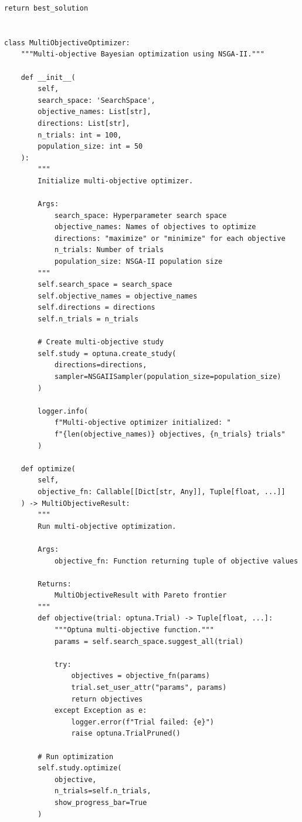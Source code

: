 \begin{lstlisting}[style=python, caption={Multi-objective optimization with Pareto frontier}]
        return best_solution


class MultiObjectiveOptimizer:
    """Multi-objective Bayesian optimization using NSGA-II."""

    def __init__(
        self,
        search_space: 'SearchSpace',
        objective_names: List[str],
        directions: List[str],
        n_trials: int = 100,
        population_size: int = 50
    ):
        """
        Initialize multi-objective optimizer.

        Args:
            search_space: Hyperparameter search space
            objective_names: Names of objectives to optimize
            directions: "maximize" or "minimize" for each objective
            n_trials: Number of trials
            population_size: NSGA-II population size
        """
        self.search_space = search_space
        self.objective_names = objective_names
        self.directions = directions
        self.n_trials = n_trials

        # Create multi-objective study
        self.study = optuna.create_study(
            directions=directions,
            sampler=NSGAIISampler(population_size=population_size)
        )

        logger.info(
            f"Multi-objective optimizer initialized: "
            f"{len(objective_names)} objectives, {n_trials} trials"
        )

    def optimize(
        self,
        objective_fn: Callable[[Dict[str, Any]], Tuple[float, ...]]
    ) -> MultiObjectiveResult:
        """
        Run multi-objective optimization.

        Args:
            objective_fn: Function returning tuple of objective values

        Returns:
            MultiObjectiveResult with Pareto frontier
        """
        def objective(trial: optuna.Trial) -> Tuple[float, ...]:
            """Optuna multi-objective function."""
            params = self.search_space.suggest_all(trial)

            try:
                objectives = objective_fn(params)
                trial.set_user_attr("params", params)
                return objectives
            except Exception as e:
                logger.error(f"Trial failed: {e}")
                raise optuna.TrialPruned()

        # Run optimization
        self.study.optimize(
            objective,
            n_trials=self.n_trials,
            show_progress_bar=True
        )


\end{lstlisting}
